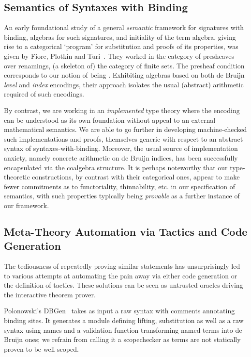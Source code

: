 \subsection{Semantics of Syntaxes with Binding} An early foundational study
of a general \emph{semantic} framework for signatures with binding, algebras
for such signatures, and initiality of the term algebra, giving rise to a
categorical `program' for substitution and proofs of its properties, was given
by Fiore, Plotkin and Turi~\cite{FiorePlotkinTuri99}. They worked in the category of presheaves
over renamings, (a skeleton of) the category of finite sets. The presheaf
condition corresponds to our notion of being . Exhibiting
algebras based on both de Bruijn \emph{level} and \emph{index} encodings,
their approach isolates the usual (abstract) arithmetic required of such encodings.

By contrast, we are working in an \emph{implemented} type theory where the
encoding can be understood as its own foundation without appeal to an external
mathematical semantics. We are able to go further in developing machine-checked
such implementations and proofs, themselves generic with respect to an abstract syntax
 of syntaxes-with-binding. Moreover, the usual source of implementation
anxiety, namely concrete arithmetic on de Bruijn indices, has been successfully
encapsulated via the  coalgebra structure. It is perhaps noteworthy that
our type-theoretic constructions, by contrast with their categorical ones,
appear to make fewer commitments as to functoriality, thinnability, etc. in our
specification of semantics, with such properties typically being \emph{provable}
as a further instance of our framework.

\subsection{Meta-Theory Automation via Tactics and Code Generation} The
tediousness of repeatedly
proving similar statements has unsurprisingly led to various attempts at
automating the pain away via either code generation or the definition of
tactics. These solutions can be seen as untrusted oracles driving the
interactive theorem prover.

Polonowski's DBGen~\citeyear{polonowski:db} takes as input a raw syntax with
comments annotating binding sites. It generates a module defining lifting,
substitution as well as a raw syntax using names and a validation function
transforming named terms into de Bruijn ones; we refrain from calling it a
scopechecker as terms are not statically proven to be well scoped.

